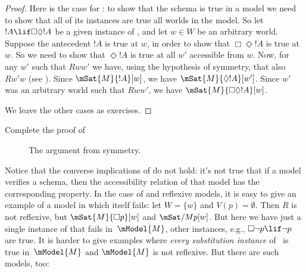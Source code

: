 \documentclass[../../../include/open-logic-section]{subfiles}
\begin{document}
\begin{proof}
  Here is the case for : to show that the schema is true in a
  model we need to show that all of its instances are true all worlds
  in the model. So let $!A \lif \Box\Diamond !A$ be a given instance
  of , and let $w \in W$ be an arbitrary world. Suppose the
  antecedent $!A$ is true at $w$, in order to show that $\Box \Diamond
  !A$ is true at $w$. So we need to show that $\Diamond !A$ is true at
  all $w'$ accessible from $w$. Now, for any $w'$ such that $Rww'$ we
  have, using the hypothesis of symmetry, that also $Rw'w$ (see
  ). Since $\mSat{M}{!A}[w]$, we have
  $\mSat{M}{\Diamond !A}[w']$. Since $w'$ was an arbitrary world such
  that $Rww'$, we have $\mSat{M}{\Box\Diamond!A}[w]$.

  We leave the other cases as exercises.
\end{proof}

\begin{prob}
  Complete the proof of 
\end{prob}

\begin{figure}
  \begin{center}
  \end{center}
\caption{The argument from symmetry.}
\end{figure}

Notice that the converse implications of  do
not hold: it's not true that if a model verifies a schema, then the
accessibility relation of that model has the corresponding property.
In the case of  and reflexive models, it is easy to give an
example of a model in which  itself fails: let $W = \{w\}$ and
$V(p) = \emptyset$. Then $R$ is not reflexive, but $\mSat{M}{\Box
  p}[w]$ and $\mSat/{M}{p}[w]$. But here we have just a single
instance of  that fails in~$\mModel{M}$, other instances, e.g.,
$\Box \lnot p \lif \lnot p$ are true. It is harder to give examples
where \emph{every substitution instance} of~ is true
in~$\mModel{M}$ and $\mModel{M}$ is not reflexive. But there are such
models, too:
\end{document}

